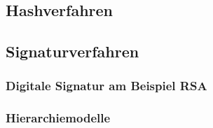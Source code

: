 \documentclass[a4paper,12pt]{article}
\begin{document}
    
\subsection{Hashverfahren}

\subsection{Signaturverfahren}
\subsubsection{Digitale Signatur am Beispiel RSA}
\subsubsection{Hierarchiemodelle}
\end{document}
